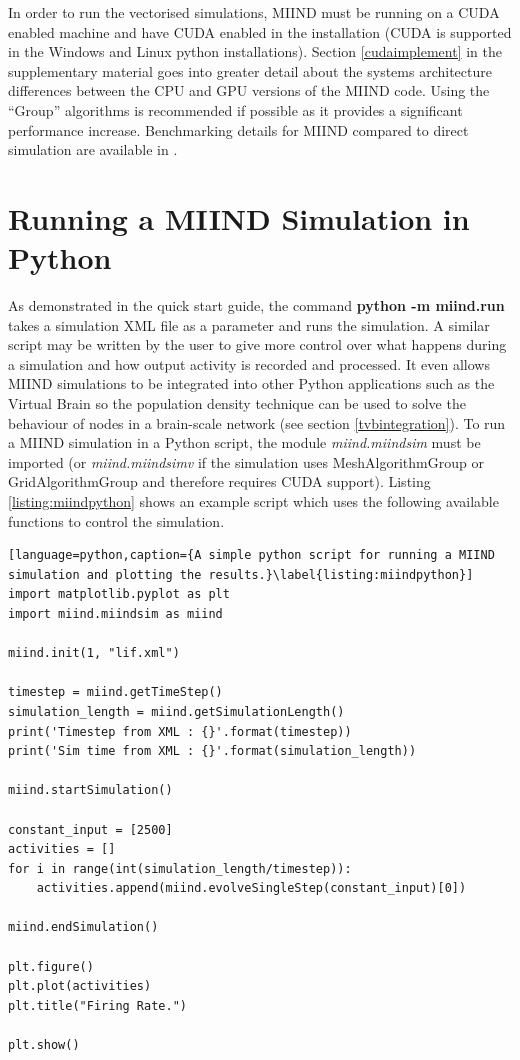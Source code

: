 \documentclass[utf8]{frontiersSCNS} %
\begin{document}
In order to run the vectorised simulations, MIIND must be running on a CUDA enabled machine and have CUDA enabled in the installation (CUDA is supported in the Windows and Linux python installations). Section \ref{cudaimplement} in the supplementary material goes into greater detail about the systems architecture differences between the CPU and GPU versions of the MIIND code. Using the ``Group'' algorithms is recommended if possible as it provides a significant performance increase. Benchmarking details for MIIND compared to direct simulation are available in \cite{de2019computational}.\\

\section{Running a MIIND Simulation in Python}
\label{miindpython}
As demonstrated in the quick start guide, the command \textbf{python -m miind.run} takes a simulation XML file as a parameter and runs the simulation. A similar script may be written by the user to give more control over what happens during a simulation and how output activity is recorded and processed. It even allows MIIND simulations to be integrated into other Python applications such as the Virtual Brain \citep{sanz2013virtual} so the population density technique can be used to solve the behaviour of nodes in a brain-scale network (see section \ref{tvbintegration}). To run a MIIND simulation in a Python script, the module \textit{miind.miindsim} must be imported (or \textit{miind.miindsimv} if the simulation uses MeshAlgorithmGroup or GridAlgorithmGroup and therefore requires CUDA support). Listing \ref{listing:miindpython} shows an example script which uses the following available functions to control the simulation.\\

\begin{lstlisting}[language=python,caption={A simple python script for running a MIIND simulation and plotting the results.}\label{listing:miindpython}]
import matplotlib.pyplot as plt
import miind.miindsim as miind

miind.init(1, "lif.xml")

timestep = miind.getTimeStep()
simulation_length = miind.getSimulationLength()
print('Timestep from XML : {}'.format(timestep))
print('Sim time from XML : {}'.format(simulation_length))

miind.startSimulation()

constant_input = [2500]
activities = []
for i in range(int(simulation_length/timestep)):
    activities.append(miind.evolveSingleStep(constant_input)[0])

miind.endSimulation()

plt.figure()
plt.plot(activities)
plt.title("Firing Rate.")

plt.show()
\end{lstlisting}
\end{document}
